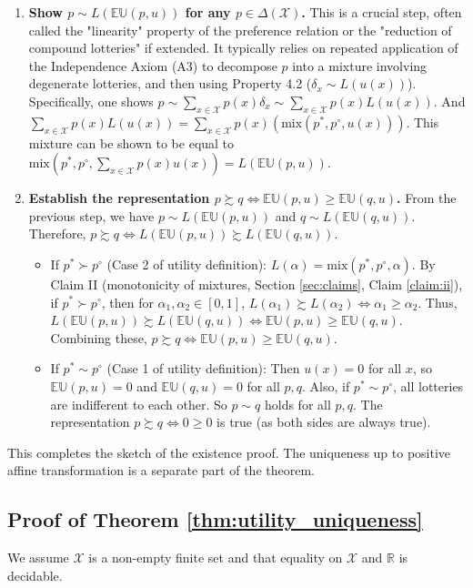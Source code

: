 \documentclass{article}
\theoremstyle{definition}
\newcommand{\R}{\mathbb{R}}
\newcommand{\X}{\mathcal{X}}
\newcommand{\EU}{\mathbb{EU}}
\newcommand{\DeltaX}{\Delta(\X)} %
\newcommand{\pref}{\succsim} %
\newcommand{\strictpref}{\succ} %
\newcommand{\indiff}{\sim} %
\newcommand{\mix}{\mathrm{mix}} %
\begin{document}
\begin{enumerate}
    \item \textbf{Show $p \indiff L(\EU(p,u))$ for any $p \in \DeltaX$.}
    This is a crucial step, often called the "linearity" property of the preference relation or the "reduction of compound lotteries" if extended. It typically relies on repeated application of the Independence Axiom (A3) to decompose $p$ into a mixture involving degenerate lotteries, and then using Property 4.2 ($\delta_x \indiff L(u(x))$).
    Specifically, one shows $p \indiff \sum_{x \in \X} p(x) \delta_x \indiff \sum_{x \in \X} p(x) L(u(x))$.
    And $\sum_{x \in \X} p(x) L(u(x)) = \sum_{x \in \X} p(x) (\text{mix}(p^*,p^\circ, u(x)))$.
    This mixture can be shown to be equal to $\text{mix}(p^*, p^\circ, \sum_{x \in \X} p(x)u(x)) = L(\EU(p,u))$.

    \item \textbf{Establish the representation $p \pref q \iff \EU(p, u) \ge \EU(q, u)$.}
    From the previous step, we have $p \indiff L(\EU(p,u))$ and $q \indiff L(\EU(q,u))$.
    Therefore, $p \pref q \iff L(\EU(p,u)) \pref L(\EU(q,u))$.
    \begin{itemize}
        \item If $p^* \strictpref p^\circ$ (Case 2 of utility definition):
        $L(\alpha) = \mix(p^*, p^\circ, \alpha)$. By Claim II (monotonicity of mixtures, Section \ref{sec:claims}, Claim \ref{claim:ii}), if $p^* \strictpref p^\circ$, then for $\alpha_1, \alpha_2 \in [0,1]$, $L(\alpha_1) \pref L(\alpha_2) \iff \alpha_1 \ge \alpha_2$.
        Thus, $L(\EU(p,u)) \pref L(\EU(q,u)) \iff \EU(p,u) \ge \EU(q,u)$.
        Combining these, $p \pref q \iff \EU(p,u) \ge \EU(q,u)$.
        \item If $p^* \indiff p^\circ$ (Case 1 of utility definition):
        Then $u(x)=0$ for all $x$, so $\EU(p,u)=0$ and $\EU(q,u)=0$ for all $p,q$.
        Also, if $p^* \indiff p^\circ$, all lotteries are indifferent to each other. So $p \indiff q$ holds for all $p,q$.
        The representation $p \pref q \iff 0 \ge 0$ is true (as both sides are always true).
    \end{itemize}
\end{enumerate}
This completes the sketch of the existence proof. The uniqueness up to positive affine transformation is a separate part of the theorem.

\subsection{Proof of Theorem \ref{thm:utility_uniqueness}}\label{proof:thm:utility_uniqueness}
We assume $\X$ is a non-empty finite set and that equality on $\X$ and $\R$ is decidable.
\end{document}
